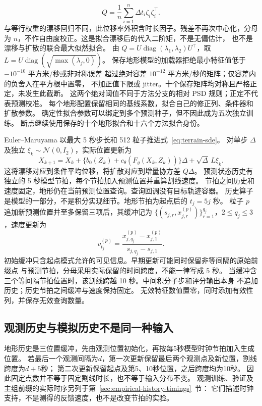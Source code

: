 \documentclass[UTF8,11pt]{ctexart}
\begin{document}
\begin{equation}
Q=\frac1n\sum_{i=1}^n\Delta t_i\zeta_i\zeta_i^\top.
\label{eq:terrain-rate-Q}
\end{equation}
与等行权重的漂移回归不同，此位移率外积含时长因子。残差不再次中心化，分母为
\(n\)，不作自由度校正。这是拟合漂移后的代入二阶矩，不是无偏估计，
也不是漂移与扩散的联合最大似然拟合。
由 \(Q=U\operatorname{diag}(\lambda_1,\lambda_2)U^\top\)，取
\(L=U\operatorname{diag}(\sqrt{\max(\lambda_j,0)})\)。
保存地形模型的加载器拒绝最小特征值低于 \(-10^{-10}\) 平方米/秒或非对称误差
超过绝对容差 \(10^{-12}\) 平方米/秒的矩阵；仅容差内的负舍入在平方根中置零，
不加正值下限或 jitter。十个保存矩阵均对称且严格正定，未发生此截断。
这两个绝对阈值不同于方法分支的相对 PSD 规则；正定不代表预测校准。
每个地形配置保留相同的基线系数，拟合自己的修正列、条件器和扩散参数。
确定性拟合参数可以绑定到多个预测种子，但不因此成为五次独立训练。
断点继续使用保存的十个地形拟合和十六个方法拟合身份。

Euler--Maruyama 以最大 5 秒步长和 512 粒子推进式~\eqref{eq:terrain-sde}。
对单步 \(\Delta\) 及独立 \(\xi_k\sim\mathcal N(0,I_2)\)，实际位置更新为
\begin{equation}
X_{k+1}=X_k+\{b_0(Z_k)+c_\theta(F_g(X_k,Z_k))\}\Delta+\sqrt{\Delta}\,L\xi_k.
\label{eq:terrain-update}
\end{equation}
这将漂移对应到条件平均位移，将扩散对应到增量协方差 \(Q\Delta\)。
预测状态历史有独立的 5 秒模型节拍，每个节拍加入预测位置并重算割线速度。
节拍之间历史和速度固定，地形仍在当前预测位置查询。查询回调没有目标轨迹容器。
历史算子是模型的一部分，不是积分实现细节。地形节拍为起点后的 \(t_j=5j\) 秒。
粒子 \(p\) 追加新预测位置并至多保留三项后，其缓冲记为
\(\{(s_{j,r},x^{(p)}_{j,r})\}_{r=1}^{q_j}\)，\(2\le q_j\le3\)，速度更新为
\begin{equation}
v^{(p)}_{t_j}=\frac{x^{(p)}_{j,q_j}-x^{(p)}_{j,1}}
                        {s_{j,q_j}-s_{j,1}}.
\label{eq:terrain-history}
\end{equation}
初始缓冲只含起点模式允许的可见信息。早期更新可能同时保留非等间隔的原始前缀点
与预测节拍，分母采用实际保留的时间跨度，不能一律写成 5 秒。
当缓冲含三个等间隔节拍位置时，该割线跨越 10 秒。中间积分子步和评分输出本身
不追加历史；历史节拍之间缓冲与速度保持固定。
无效特征数值置零，同时添加有效性列，并保存无效查询数量。

\subsection{观测历史与模拟历史不是同一种输入}
\label{sec:history-feedback}
地形历史是三位置缓冲，先由观测位置初始化，再按每5秒模型时钟节拍加入生成位置。
若最后一个观测间隔为\(d\)，第一次更新保留最后两个观测点及新位置，割线跨度为\(d+5\)秒；
第二次更新保留起点及第5、10秒位置，之后跨度均为10秒。
因此固定点数并不等于固定割线时长，也不等于输入分布不变。
观测训练、验证及主组前缀的实际时序另列于第~\ref{sec:empirical-history-timings}~节：
它们描述时钟支持，不是测得的反馈速度，也不是改变节拍的实验。
\end{document}
